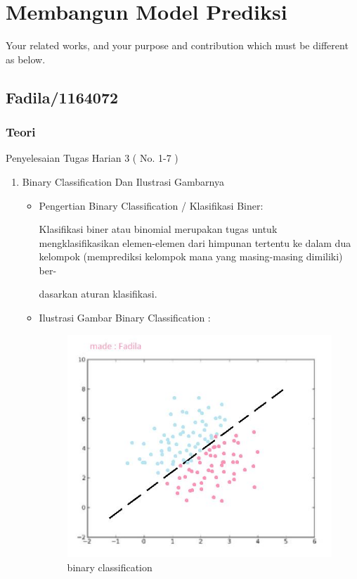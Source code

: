 \chapter{Membangun Model Prediksi}

Your related works, and your purpose and contribution which must be different as below.

\section{Fadila/1164072}
\subsection{Teori}
Penyelesaian Tugas Harian 3 ( No. 1-7 )
\begin{enumerate}
\item Binary Classification Dan Ilustrasi Gambarnya
\begin{itemize}
\item Pengertian Binary Classification / Klasifikasi Biner:
\par Klasifikasi biner atau binomial merupakan tugas untuk mengklasifikasikan elemen-elemen dari himpunan tertentu ke dalam dua kelompok (memprediksi kelompok mana yang masing-masing dimiliki) ber-
\par dasarkan aturan klasifikasi.
\item Ilustrasi Gambar Binary Classification :
\par

\begin{figure}[ht]
\centering
\includegraphics[scale=0.3]{figures/binary.jpg}
\caption{binary classification}
\label{contoh}
\end{figure}


\end{itemize}
\end{enumerate}
